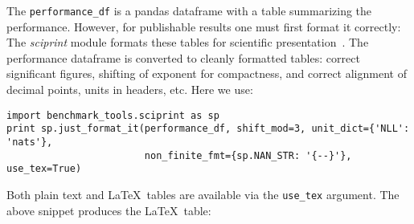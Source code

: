\documentclass{article}
\newcommand{\code}{\texttt}
\begin{document}
The \code{performance\_df} is a pandas dataframe with a table summarizing the performance.
However, for publishable results one must first format it correctly:
The \emph{sciprint} module formats these tables for scientific presentation~\citep{Cole2015}.
The performance dataframe is converted to cleanly formatted tables: correct significant figures, shifting of exponent for compactness, and correct alignment of decimal points, units in headers, etc.
Here we use:
\vspace{-3mm}
\begin{verbatim}
import benchmark_tools.sciprint as sp
print sp.just_format_it(performance_df, shift_mod=3, unit_dict={'NLL': 'nats'},
                        non_finite_fmt={sp.NAN_STR: '{--}'}, use_tex=True)
\end{verbatim}
\vspace{-3mm}
Both plain text and \LaTeX\ tables are available via the \code{use\_tex} argument.
The above snippet produces the \LaTeX\ table:
\end{document}
